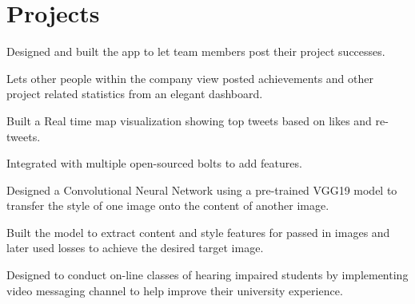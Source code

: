 \documentclass[]{rinkal_resume}
\begin{document}
\begin{minipage}[t]{0.69\textwidth}

\section{Projects}
\begin{tightemize}
\item Designed and built the app to let team members post their project successes.
\item Lets other people within the company view posted achievements and other project related statistics from an elegant dashboard.
\end{tightemize}
\smallsectionsep

\begin{tightemize}
\item Built a Real time map visualization showing top tweets based on likes and re-tweets.
\item Integrated with multiple open-sourced bolts to add features.
\end{tightemize}
\smallsectionsep

\begin{tightemize}
\item Designed a Convolutional Neural Network using a pre-trained VGG19 model to transfer the style of one image onto the content of another image.
\item Built the model to extract content and style features for passed in images and later used losses to achieve the desired target image.
\end{tightemize}
\smallsectionsep

\begin{tightemize}
\item Designed to conduct on-line classes of hearing impaired students by implementing video messaging channel to help improve their university experience.
\item 
\end{tightemize}
\smallsectionsep


\end{minipage}
\end{document}
